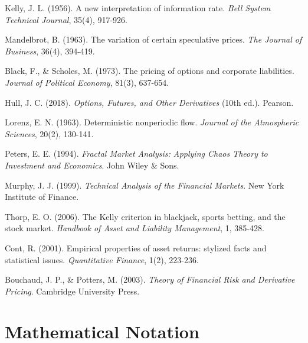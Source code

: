 \documentclass[12pt,a4paper]{article}
\begin{document}

\begin{thebibliography}{99}

Kelly, J. L. (1956). A new interpretation of information rate. \textit{Bell System Technical Journal}, 35(4), 917-926.

Mandelbrot, B. (1963). The variation of certain speculative prices. \textit{The Journal of Business}, 36(4), 394-419.

Black, F., \& Scholes, M. (1973). The pricing of options and corporate liabilities. \textit{Journal of Political Economy}, 81(3), 637-654.

Hull, J. C. (2018). \textit{Options, Futures, and Other Derivatives} (10th ed.). Pearson.

Lorenz, E. N. (1963). Deterministic nonperiodic flow. \textit{Journal of the Atmospheric Sciences}, 20(2), 130-141.

Peters, E. E. (1994). \textit{Fractal Market Analysis: Applying Chaos Theory to Investment and Economics}. John Wiley \& Sons.

Murphy, J. J. (1999). \textit{Technical Analysis of the Financial Markets}. New York Institute of Finance.

Thorp, E. O. (2006). The Kelly criterion in blackjack, sports betting, and the stock market. \textit{Handbook of Asset and Liability Management}, 1, 385-428.

Cont, R. (2001). Empirical properties of asset returns: stylized facts and statistical issues. \textit{Quantitative Finance}, 1(2), 223-236.

Bouchaud, J. P., \& Potters, M. (2003). \textit{Theory of Financial Risk and Derivative Pricing}. Cambridge University Press.

\end{thebibliography}

\appendix

\section{Mathematical Notation}
\end{document}
